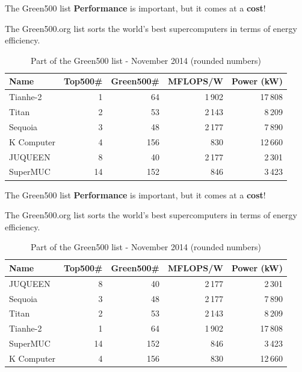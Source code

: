\documentclass[10pt, compress]{beamer}
\begin{document}
\begin{frame}[fragile]{The Green500 list}
\textbf{Performance} is important, but it comes at a \textbf{cost}!

The Green500.org list sorts the world's best supercomputers in terms of energy efficiency.

  \begin{table}
    \caption{Part of the Green500 list - November 2014 (rounded numbers)}
    \begin{tabular}{lrrrr}
      \toprule
      Name & \alert{Top500\#} & Green500\# & MFLOPS/W & Power (kW)\\
      \midrule
      Tianhe-2  & 1 & 64 & 1\,902 & 17\,808 \\
      Titan     & 2 & 53 & 2\,143 & 8\,209 \\
      Sequoia   & 3 & 48 & 2\,177 & 7\,890 \\
      K Computer& 4 & 156& 830    & 12\,660 \\
      JUQUEEN   & 8 & 40 & 2\,177 & 2\,301 \\
      SuperMUC  & 14& 152& 846    & 3\,423 \\
      \bottomrule
    \end{tabular}
  \end{table}
\end{frame}


\begin{frame}[fragile]{The Green500 list}
\textbf{Performance} is important, but it comes at a \textbf{cost}!

The Green500.org list sorts the world's best supercomputers in terms of energy efficiency.

  \begin{table}
    \caption{Part of the Green500 list - November 2014 (rounded numbers)}
    \begin{tabular}{lrrrr}
      \toprule
      Name & Top500\# & \alert{Green500\#} & MFLOPS/W & Power (kW)\\
      \midrule
      JUQUEEN   & 8 & 40 & 2\,177 & 2\,301 \\ 
      Sequoia   & 3 & 48 & 2\,177 & 7\,890 \\      
      Titan     & 2 & 53 & 2\,143 & 8\,209 \\
      Tianhe-2  & 1 & 64 & 1\,902 & 17\,808 \\
      SuperMUC  & 14& 152& 846    & 3\,423 \\      
      K Computer& 4 & 156& 830    & 12\,660 \\
      \bottomrule
    \end{tabular}
  \end{table}
\end{frame}
\end{document}
